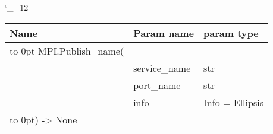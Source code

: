 \begingroup \catcode`\_=12 \tt
\begin{tabular}{lll}
\toprule
\textrm{Name}&\textrm{Param name}&\textrm{param type}\\
\midrule
\hbox to 0pt {MPI.Publish_name(\hss}\\
& service_name & str\\
& port_name & str\\
& info & Info = Ellipsis\\
\hbox to 0pt{) -> None\hss}\\
\bottomrule
\end{tabular}
\endgroup

